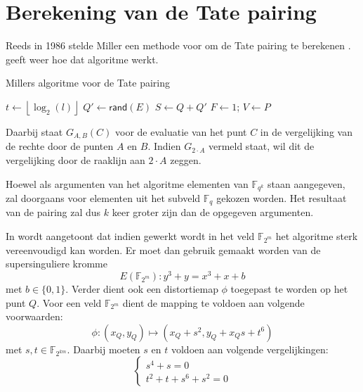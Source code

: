 \section{Berekening van de Tate pairing\label{sectie-pairings-berekening}}

Reeds in 1986 stelde Miller een methode voor om de Tate pairing te berekenen \cite{miller, barreto-efficient}.  geeft weer hoe dat algoritme werkt.

\begin{algorithm}[h]
	\caption{Millers algoritme voor de Tate pairing}
	\label{algoritme-pairings-miller}
	$t \gets \left\lfloor \log _2 (l) \right\rfloor$\;
	$Q' \gets \textsf{rand}(E)$\;
	$S \gets Q + Q'$\;
	$F \gets 1$; $V \gets P$\;	
\end{algorithm}

Daarbij staat $G_{A, B}(C)$ voor de evaluatie van het punt $C$ in de vergelijking van de rechte door de punten $A$ en $B$. Indien $G_{2 \cdot A}$ vermeld staat, wil dit de vergelijking door de raaklijn aan $2 \cdot A$ zeggen.

Hoewel als argumenten van het algoritme elementen van $\mathbb{F}_{q^k}$ staan aangegeven, zal doorgaans voor elementen uit het subveld $\mathbb{F}_q$ gekozen worden. Het resultaat van de pairing zal dus $k$ keer groter zijn dan de opgegeven argumenten. 

In \cite{barreto-efficient} wordt aangetoont dat indien gewerkt wordt in het veld $\mathbb{F}_{2^m}$ het algoritme sterk vereenvoudigd kan worden. Er moet dan gebruik gemaakt worden van de supersinguliere kromme
\[E(\mathbb{F}_{2^m}): y^3 + y = x^3 + x + b\]
met $b \in \{0, 1\}$. Verder dient ook een distortiemap $\phi$ toegepast te worden op het punt $Q$. Voor een veld $\mathbb{F}_{2^m}$ dient de mapping te voldoen aan volgende voorwaarden:
\[\phi : (x_Q, y_Q) \mapsto (x_Q + s^2, y_Q + x_Q s + t^6)\]
met $s, t \in \mathbb{F}_{2^{km}}$. Daarbij moeten $s$ en $t$ voldoen aan volgende vergelijkingen:
\[\left\{\begin{array}{l}
s^4 + s = 0\\
t^2 + t + s^6 + s^2 = 0
\end{array}\right.\]

